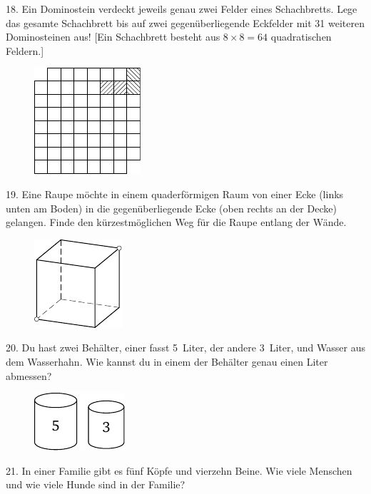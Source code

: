 \begin{problem}{18.}
	Ein Dominostein verdeckt jeweils genau zwei Felder eines Schachbretts. Lege das gesamte Schachbrett bis auf zwei gegenüberliegende Eckfelder mit 31 weiteren Dominosteinen aus! [Ein Schachbrett besteht aus $8 \times 8 = 64$ quadratischen Feldern.]
	\begin{figure}
		\includegraphics{taskbook-2}
	\end{figure}
\end{problem}

\begin{problem}{19.}
	Eine Raupe möchte in einem quaderförmigen Raum von einer Ecke (links unten am Boden) in die gegenüberliegende Ecke (oben rechts an der Decke) gelangen. 
	Finde den kürzestmöglichen Weg für die Raupe entlang der Wände. 
	\begin{figure}
		\includegraphics{taskbook-3}
	\end{figure}
\end{problem}

\begin{problem}{20.}
	Du hast zwei Behälter, einer fasst 5~Liter, der andere 3~Liter, und Wasser aus dem Wasserhahn. Wie kannst du in einem der Behälter genau einen Liter abmessen? 
	\begin{figure}
		\includegraphics{taskbook-4}
	\end{figure}
\end{problem}

\begin{problem}{21.}
	In einer Familie gibt es fünf Köpfe und vierzehn Beine. Wie viele Menschen und wie viele Hunde sind in der Familie? 
\end{problem}

